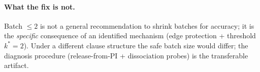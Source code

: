 \paragraph{What the fix is not.}
Batch $\le 2$ is not a general recommendation to shrink batches for accuracy; it is the \emph{specific}
consequence of an identified mechanism (edge protection + threshold $k^\ast{=}2$). Under a different clause
structure the safe batch size would differ; the diagnosis procedure (release-from-PI + dissociation probes) is
the transferable artifact.
